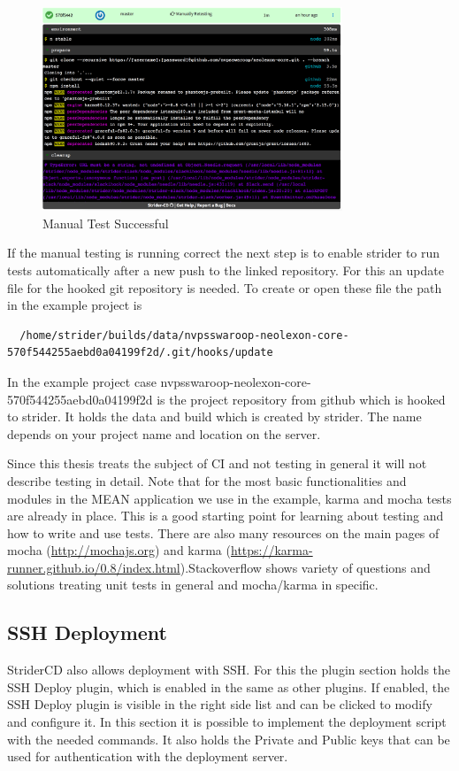 \begin{figure}[h!]
  \centering
  \includegraphics[width=0.8\textwidth]{images/successfulManualTest.png}
  \caption{Manual Test Successful}
\end{figure}

If the manual testing is running correct the next step is to enable strider to run tests automatically after a new push to the
linked repository. For this an update file for the hooked git repository is needed. To create or open these file the path in
the example project is

\begin{lstlisting}
  /home/strider/builds/data/nvpsswaroop-neolexon-core-570f544255aebd0a04199f2d/.git/hooks/update
\end{lstlisting}

In the example project case nvpsswaroop-neolexon-core-570f544255aebd0a04199f2d is the project repository from github which is hooked to strider.
It holds the data and build which is created by strider. The name depends on your project name and location on the server.

Since this thesis treats the subject of CI and not testing in general it will not describe testing in detail. Note that for the
most basic functionalities and modules in the MEAN application we use in the example, karma and mocha tests are already in place.
This is a good starting point for learning about testing and how to write and use tests. There are also many resources
on the main pages of mocha (\url{http://mochajs.org}) and karma (\url{https://karma-runner.github.io/0.8/index.html}).Stackoverflow
shows variety of questions and solutions treating unit tests in general and mocha/karma in specific.

\subsection{SSH Deployment}
\label{section:SSH Deployment}
StriderCD also allows deployment with SSH. For this the plugin section holds the SSH Deploy plugin, which is enabled in the same
as other plugins. If enabled, the SSH Deploy plugin is visible in the right side list and can be clicked to modify and configure it. In this
section it is possible to implement the deployment script with the needed commands. It also holds the Private and Public keys that can be used
for authentication with the deployment server.

